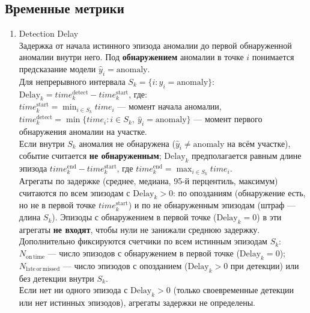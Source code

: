 \documentclass[a4paper,12pt]{report}
\begin{document}
	\subsection*{Временные метрики}
	\begin{enumerate}
		\item Detection Delay\\
		Задержка от начала истинного эпизода аномалии до первой обнаруженной аномалии внутри него. Под \textbf{обнаружением} аномалии в точке $i$ понимается предсказание модели $\hat{y}_i = \mathrm{anomaly}$.\\
		Для непрерывного интервала $S_k=\{i : y_i = \mathrm{anomaly}\}$:\\
		$\mathrm{Delay}_k=time_k^{\mathrm{detect}}-time_k^{\mathrm{start}}$, где:\\
		$time_k^{\mathrm{start}}=\min_{i\in S_k} time_i$ --- момент начала аномалии,\\
		$time_k^{\mathrm{detect}}=\min\{time_i : i\in S_k,\ \hat{y}_i = \mathrm{anomaly}\}$ --- момент первого обнаружения аномалии на участке.\\
		Если внутри $S_k$ аномалия не обнаружена ($\hat{y}_i \neq \mathrm{anomaly}$ на всём участке), событие считается \textbf{не обнаруженным}; $\mathrm{Delay}_k$ предполагается равным длине эпизода $time_k^{\mathrm{end}}-time_k^{\mathrm{start}}$, где $time_k^{\mathrm{end}}=\max_{i\in S_k} time_i$.\\
		Агрегаты по задержке (среднее, медиана, 95-й перцентиль, максимум) считаются по всем эпизодам с $\mathrm{Delay}_k > 0$: по опозданиям (обнаружение есть, но не в первой точке $time_k^{\mathrm{start}}$) и по не обнаруженным эпизодам (штраф --- длина $S_k$). Эпизоды с обнаружением в первой точке ($\mathrm{Delay}_k = 0$) в эти агрегаты \textbf{не входят}, чтобы нули не занижали среднюю задержку.\\
		Дополнительно фиксируются счетчики по всем истинным эпизодам $S_k$:\\
		$N_{\mathrm{on\,time}}$ --- число эпизодов с обнаружением в первой точке ($\mathrm{Delay}_k = 0$);\\
		$N_{\mathrm{late\,or\,missed}}$ --- число эпизодов с опозданием ($\mathrm{Delay}_k > 0$ при детекции) или без детекции внутри $S_k$.\\
		Если нет ни одного эпизода с $\mathrm{Delay}_k > 0$ (только своевременные детекции или нет истинных эпизодов), агрегаты задержки не определены.
	\end{enumerate}
\end{document}

